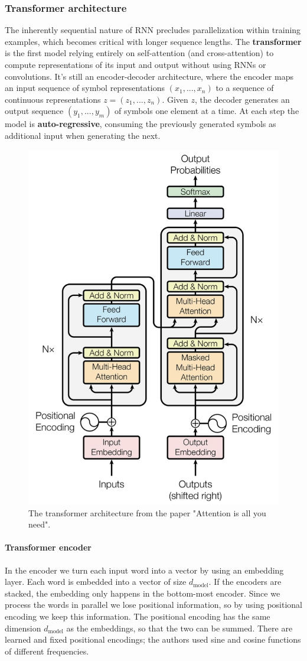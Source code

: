 \documentclass{article}
\begin{document}
\subsubsection{Transformer architecture}
The inherently sequential nature of RNN precludes parallelization within training examples, which becomes critical with longer sequence lengths.
The \textbf{transformer} is the first model relying entirely on self-attention (and cross-attention) to compute representations of its input and output without using RNNs or convolutions.
It's still an encoder-decoder architecture, where the encoder maps an input sequence of symbol representations $(x_1, ..., x_n)$ to a sequence of continuous representations $z=(z_1, ..., z_n)$.
Given $z$, the decoder generates an output sequence $(y_1, ..., y_m)$ of symbols one element at a time.
At each step the model is \textbf{auto-regressive}, consuming the previously generated symbols as additional input when generating the next.

\begin{figure}[htbp]
  \centering
  \includegraphics[width=0.6\linewidth]{./img/transformer.jpg}
  \caption{The transformer architecture from the paper "Attention is all you need".}
\end{figure}

\paragraph{Transformer encoder}
In the encoder we turn each input word into a vector by using an embedding layer.
Each word is embedded into a vector of size $d_{\text{model}}$.
If the encoders are stacked, the embedding only happens in the bottom-most encoder.
Since we process the words in parallel we lose positional information, so by using positional encoding we keep this information.
The positional encoding has the same dimension $d_{\text{model}}$ as the embeddings, so that the two can be summed.
There are learned and fixed positional encodings; the authors used sine and cosine functions of different frequencies.
\end{document}
